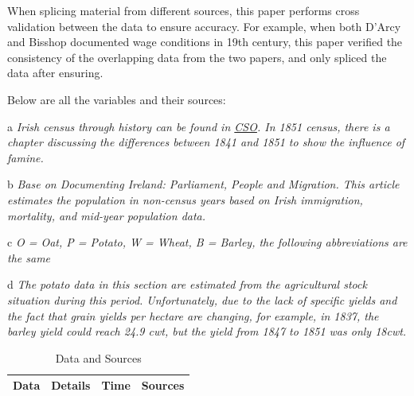 When splicing material from different sources, this paper performs cross validation between the data to ensure accuracy. For example, when both D'Arcy and Bisshop documented wage conditions in 19th century, this paper verified the consistency of the overlapping data from the two papers, and only spliced the data after ensuring. 

Below are all the variables and their sources: 

\vspace{7pt}

\begin{spacing}{1}
\begin{ThreePartTable}
    \begin{TableNotes}
        \begin{spacing}{1}
        \vspace{7pt}
        \item[a] \textit{Irish census through history can be found in \href{https://www.cso.ie/en/statistics/historicalreports/}{CSO}. In 1851 census, there is a chapter discussing the differences between 1841 and 1851 to show the influence of famine.}
        \vspace{7pt}
        \item[b] \textit{Base on Documenting Ireland: Parliament, People and Migration. This article estimates the population in non-census years based on Irish immigration, mortality, and mid-year population data.}
        \vspace{7pt}
        \item[c] \textit{O = Oat, P = Potato, W = Wheat, B = Barley, the following abbreviations are the same}
        \vspace{7pt}
        \item[d] \textit{The potato data in this section are estimated from the agricultural stock situation during this period. Unfortunately, due to the lack of specific yields and the fact that grain yields per hectare are changing, for example, in 1837, the barley yield could reach 24.9 cwt, but the yield from 1847 to 1851 was only 18cwt.}
        \end{spacing}
    \end{TableNotes}
\begin{longtable}{cccc}
    \caption{Data and Sources} \\
    \toprule %
    \textbf{Data} & \textbf{Details} & \textbf{Time} & \textbf{Sources} \\
    \midrule %
    \endfirsthead


\end{longtable}
\end{ThreePartTable}
\end{spacing}
